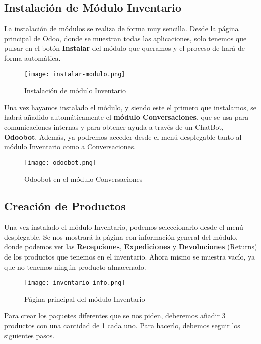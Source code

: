 \subsection{Instalación de Módulo Inventario}
La instalación de módulos se realiza de forma muy sencilla. Desde la página principal de Odoo, donde se muestran todas las aplicaciones, solo tenemos que pulsar en el botón \textbf{Instalar} del módulo que queramos y el proceso de hará de forma automática.

\begin{figure}[ht]
    \centering
    \texttt{[image: instalar-modulo.png]}
    \caption{Instalación de módulo Inventario}
\end{figure}

Una vez hayamos instalado el módulo, y siendo este el primero que instalamos, se habrá añadido automáticamente el \textbf{módulo Conversaciones}, que se usa para comunicaciones internas y para obtener ayuda a través de un ChatBot, \textbf{Odoobot}. Además, ya podremos acceder desde el menú desplegable tanto al módulo Inventario como a Conversaciones.

\begin{figure}[ht]
    \centering
    \texttt{[image: odoobot.png]}
    \caption{Odoobot en el módulo Conversaciones}
\end{figure}

\subsection{Creación de Productos}
Una vez instalado el módulo Inventario, podemos seleccionarlo desde el menú desplegable. Se nos mostrará la página con información general del módulo, donde podemos ver las \textbf{Recepciones}, \textbf{Expediciones} y \textbf{Devoluciones} (Returns) de los productos que tenemos en el inventario. Ahora mismo se muestra vacío, ya que no tenemos ningún producto almacenado.

\begin{figure}[ht]
    \centering
    \texttt{[image: inventario-info.png]}
    \caption{Página principal del módulo Inventario}
\end{figure}

Para crear los paquetes diferentes que se nos piden, deberemos añadir 3 productos con una cantidad de 1 cada uno. Para hacerlo, debemos seguir los siguientes pasos.

\vspace{5ex}

